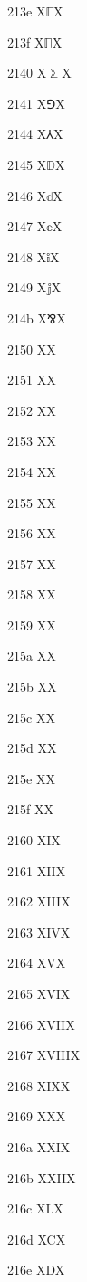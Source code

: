 \documentclass[11pt]{article}
\begin{document}
213e X{\ensuremath{\mathbb{\Gamma}}}X

213f X{\ensuremath{\mathbb{\Pi}}}X

2140 X{\ensuremath{\mathbb{\sum}}}X

2141 X{\ensuremath{\Game}}X

2144 X{\ensuremath{\Yup}}X

2145 X{\ensuremath{\mathbb{D}}}X

2146 X{\ensuremath{\mathbb{d}}}X

2147 X{\ensuremath{\mathbb{e}}}X

2148 X{\ensuremath{\mathbb{i}}}X

2149 X{\ensuremath{\mathbb{j}}}X

214b X{\ensuremath{\bindnasrepma}}X

2150 X{}X

2151 X{}X

2152 X{}X

2153 X{}X

2154 X{}X

2155 X{}X

2156 X{}X

2157 X{}X

2158 X{}X

2159 X{}X

215a X{}X

215b X{}X

215c X{}X

215d X{}X

215e X{}X

215f X{}X

2160 X{I}X

2161 X{II}X

2162 X{III}X

2163 X{IV}X

2164 X{V}X

2165 X{VI}X

2166 X{VII}X

2167 X{VIII}X

2168 X{IX}X

2169 X{X}X

216a X{XI}X

216b X{XII}X

216c X{L}X

216d X{C}X

216e X{D}X
\end{document}
